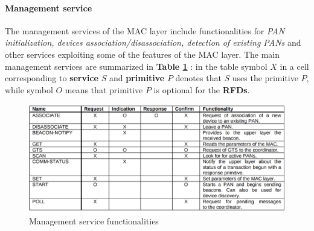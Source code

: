 \documentclass[10pt,a4paper]{report}
\theoremstyle{definition}
\begin{document}
\paragraph{Management service}\label{sec:management-service}
The management services of the MAC layer include functionalities for \textit{PAN initialization, devices association/disassociation, detection of existing PANs} and other services exploiting some of the features of the MAC layer.
The main management services are summarized in \textbf{Table \ref{management-service-list}} : in the table symbol $X$ in a cell corresponding to \textbf{service} $S$ and \textbf{primitive} $P$ denotes that $S$ uses the primitive $P$, while symbol $O$ means that primitive $P$ is optional for the \textbf{RFDs}.
\begin{figure}[h]
	\centering\includegraphics[scale=0.30]{images/Pasted image 20230417092611.png}
	\caption{Management service functionalities}
	\label{management-service-list}
\end{figure}
\end{document}
